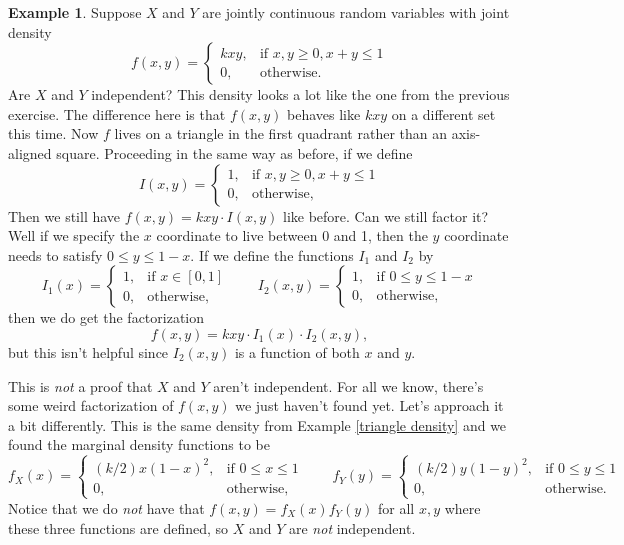 \documentclass[12pt]{article}
\theoremstyle{plain}
\theoremstyle{definition}
\newtheorem{example}[theorem]{Example}
\theoremstyle{remark}
\begin{document}
\begin{example}
Suppose $X$ and $Y$ are jointly continuous random variables with joint density
    \[
        f(x,y) = \begin{cases}
            kxy,&\text{if }x,y\geq 0, x+y\leq 1\\
            0,&\text{otherwise.}
        \end{cases}
    \]
Are $X$ and $Y$ independent?
This density looks a lot like the one from the previous exercise.
The difference here is that $f(x,y)$ behaves like $kxy$ on a different set this time.
Now $f$ lives on a triangle in the first quadrant rather than an axis-aligned square.
Proceeding in the same way as before, if we define
\[
    I(x,y) = \begin{cases}
        1,&\text{if }x,y\geq 0, x+y\leq 1\\
        0,&\text{otherwise,}
    \end{cases}
\]
Then we still have $f(x,y) = kxy\cdot I(x,y)$ like before.
Can we still factor it?
Well if we specify the $x$ coordinate to live between 0 and 1, then the $y$ coordinate needs to satisfy $0\leq y\leq 1-x$.
If we define the functions $I_1$ and $I_2$ by
\[
    I_1(x) = \begin{cases}
        1,&\text{if }x\in [0,1]\\
        0,&\text{otherwise,}
    \end{cases} \qquad
    I_2(x,y) = \begin{cases}
        1,&\text{if }0\leq y\leq 1-x\\
        0,&\text{otherwise,}
    \end{cases}
\]
then we do get the factorization
\[
    f(x,y) = kxy \cdot I_1(x)\cdot I_2(x,y),
\]
but this isn't helpful since $I_2(x,y)$ is a function of both $x$ and $y$.

This is \emph{not} a proof that $X$ and $Y$ aren't independent.
For all we know, there's some weird factorization of $f(x,y)$ we just haven't found yet.
Let's approach it a bit differently.
This is the same density from Example \ref{triangle density} and we found the marginal density functions to be
\[
    f_X(x) = \begin{cases}
        (k/2)x(1-x)^2,&\text{if }0\leq x \leq 1\\
        0,&\text{otherwise,}
    \end{cases}\qquad
    f_Y(y) = \begin{cases}
        (k/2)y(1-y)^2,&\text{if }0\leq y \leq 1\\
        0,&\text{otherwise.}
    \end{cases}
\]
Notice that we do \emph{not} have that $f(x,y) = f_X(x)f_Y(y)$ for all $x,y$ where these three functions are defined, so $X$ and $Y$ are \emph{not} independent.
\end{example}
\end{document}
